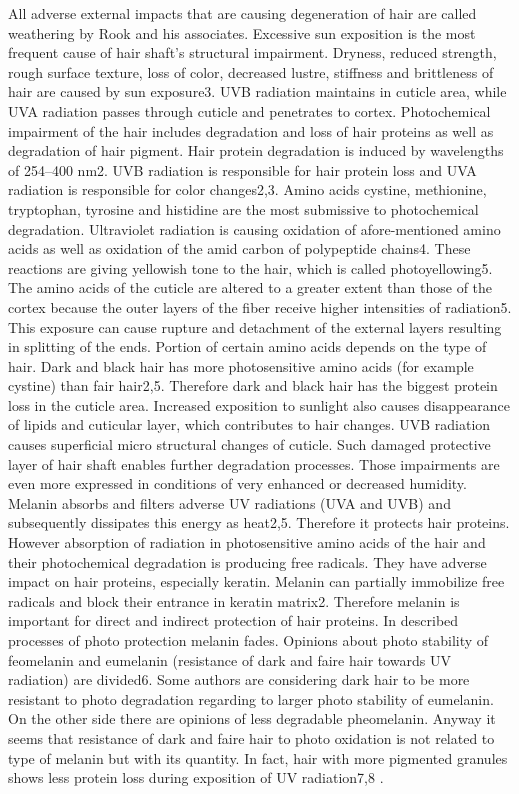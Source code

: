 \documentclass[]{interact}
\theoremstyle{plain}%
\theoremstyle{definition}
\theoremstyle{remark}
\begin{document}

All adverse external impacts that are causing degeneration of hair are called weathering by Rook and his associates. Excessive sun exposition is the most frequent cause of hair shaft’s structural impairment. Dryness, reduced strength, rough surface texture, loss of color, decreased lustre, stiffness and brittleness of hair are caused by sun exposure3. UVB radiation maintains in cuticle area, while UVA radiation passes through cuticle and penetrates to cortex. Photochemical impairment of the hair includes degradation and loss of hair proteins as well as degradation of hair pigment. Hair protein degradation is induced by wavelengths of 254–400 nm2. UVB radiation is responsible for hair protein loss and UVA radiation is responsible for color changes2,3. Amino acids cystine, methionine, tryptophan, tyrosine and histidine are the most submissive to photochemical degradation.
Ultraviolet radiation is causing oxidation of afore-mentioned amino acids as well as oxidation of the amid carbon of polypeptide chains4. These reactions are giving yellowish tone to the hair, which is called photoyellowing5. The amino acids of the cuticle are altered to a greater extent than those of the cortex because the outer layers of the fiber receive higher intensities of radiation5. This exposure can cause rupture and detachment of the external layers resulting in splitting of the ends. Portion of certain amino acids depends on the type of hair. Dark and black hair has more photosensitive amino acids (for example cystine) than fair hair2,5. Therefore dark and black hair has the biggest protein loss in the cuticle area.
Increased exposition to sunlight also causes disappearance of lipids and cuticular layer, which contributes to hair changes. UVB radiation causes superficial micro structural changes of cuticle. Such damaged protective
layer of hair shaft enables further degradation processes.
Those impairments are even more expressed in conditions of very enhanced or decreased humidity. Melanin absorbs and filters adverse UV radiations (UVA and UVB) and subsequently dissipates this energy as heat2,5. Therefore it protects hair proteins. However absorption
of radiation in photosensitive amino acids of the hair and their photochemical degradation is producing free radicals. They have adverse impact on hair proteins, especially keratin. Melanin can partially immobilize free radicals and block their entrance in keratin matrix2. Therefore melanin is important for direct and indirect protection of hair proteins. In described processes of photo protection melanin fades. Opinions about photo stability of feomelanin and eumelanin (resistance of dark and faire hair towards UV radiation) are divided6. Some authors are considering dark hair to be more resistant to photo degradation regarding to larger photo stability of eumelanin. On the other side there are opinions of less degradable pheomelanin. Anyway it seems that resistance of dark and faire hair to photo oxidation is not related to type of melanin but with its quantity. In fact, hair with more pigmented granules shows less protein loss during exposition of UV radiation7,8 \cite{sebetic2008}.
\end{document}
